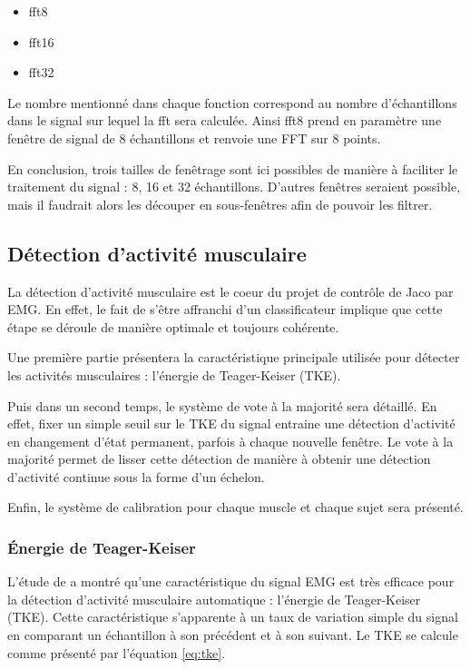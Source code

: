 \documentclass[letterpaper, twoside, 12pt, memoire, creativecommons, hyperref]{thETS}
\begin{document}
\begin{itemize}
 \item fft8
 \item fft16
 \item fft32
\end{itemize}

Le nombre mentionné dans chaque fonction correspond au nombre d'échantillons dans le signal sur lequel la fft sera calculée. Ainsi fft8 prend en paramètre une fenêtre de signal de 8 échantillons et renvoie une FFT sur 8 points.

En conclusion, trois tailles de fenêtrage sont ici possibles de manière à faciliter le traitement du signal : 8, 16 et 32 échantillons. D'autres fenêtres seraient possible, mais il faudrait alors les découper en sous-fenêtres afin de pouvoir les filtrer. 

\subsection{Détection d'activité musculaire}\label{CHdetect}

La détection d'activité musculaire est le coeur du projet de contrôle de Jaco par EMG. En effet, le fait de s'être affranchi d'un classificateur implique que cette étape se déroule de manière optimale et toujours cohérente.

Une première partie présentera la caractéristique principale utilisée pour détecter les activités musculaires : l'énergie de Teager-Keiser (TKE). 

Puis dans un second temps, le système de vote à la majorité sera détaillé. En effet, fixer un simple seuil sur le TKE du signal entraine une détection d'activité en changement d'état permanent, parfois à chaque nouvelle fenêtre. Le vote à la majorité permet de lisser cette détection de manière à obtenir une détection d'activité continue sous la forme d'un échelon.

Enfin, le système de calibration pour chaque muscle et chaque sujet sera présenté.

\subsubsection{Énergie de Teager-Keiser}
\label{CHtke}

L'étude de \cite{li2007} a montré qu'une caractéristique du signal EMG est très efficace pour la détection d'activité musculaire automatique : l'énergie de Teager-Keiser (TKE). Cette caractéristique s'apparente à un taux de variation simple du signal en comparant un échantillon à son précédent et à son suivant. Le TKE se calcule comme présenté par l'équation \ref{eq:tke}.
\end{document}

